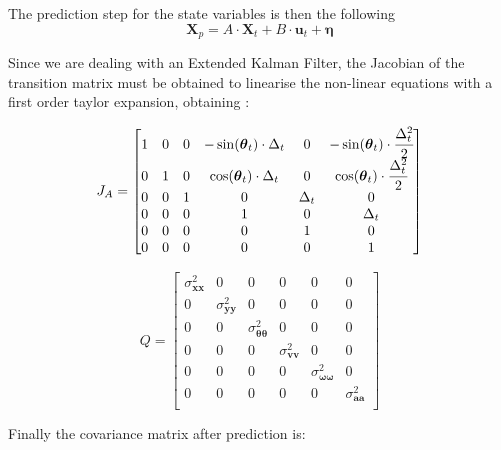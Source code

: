The prediction step for the state variables is then the following
\begin{equation}
\mathbf{X}_{p} = A \cdot \mathbf{X}_t + B \cdot \mathbf{u}_t + \boldsymbol \eta
\end{equation}




Since we are dealing with an Extended Kalman Filter, the Jacobian of the transition matrix must be obtained to linearise the non-linear equations with a first order taylor expansion, obtaining :

\begin{equation}
J_A
=
\begin{bmatrix}

1 & 0 & 0 & -\sin(\boldsymbol \theta_t) \cdot \Delta_t & 0 & -\sin(\boldsymbol \theta_t) \cdot  \cfrac{\Delta_t^2 }{2} \\
0 & 1 & 0 & \cos(\boldsymbol \theta_t) \cdot \Delta_t & 0 & \cos(\boldsymbol \theta_t) \cdot  \cfrac{\Delta_t^2 }{2} \\
0 & 0 & 1 & 0 & \Delta_t & 0 \\
0 & 0 & 0 & 1 & 0 & \Delta_t \\
0 & 0 & 0 & 0 & 1 & 0 \\
0 & 0 & 0 & 0 & 0 & 1
\end{bmatrix}
\end{equation}

\begin{equation}
Q
=
\begin{bmatrix}
\sigma_{\mathbf{xx}}^2 & 0 & 0 & 0 & 0 & 0 \\
0 & \sigma_{\mathbf{yy}}^2 & 0 & 0 & 0 & 0 \\
0 & 0 & \sigma_{\mathbf{\boldsymbol \theta \boldsymbol \theta}}^2 & 0 & 0 & 0 \\
0 & 0 & 0 & \sigma_{\mathbf{vv}}^2 & 0 & 0 \\
0 & 0 & 0 & 0 & \sigma_{{\boldsymbol \omega}{\boldsymbol \omega}}^2 & 0 \\
0 & 0 & 0 & 0 & 0 & \sigma_{\mathbf{aa}}^2 \\
\end{bmatrix}
\end{equation}

Finally the covariance matrix after prediction is:

